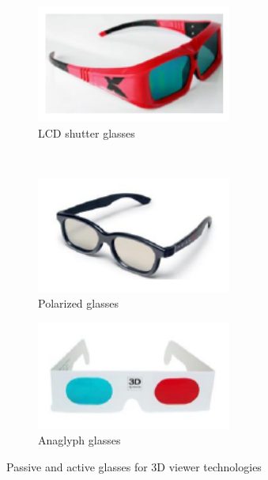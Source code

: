\begin{figure}[h!]
\centering
\label{fig:glass}
\begin{subfigure}[]{0.4\textwidth}
\centering
\includegraphics[width=0.7\textwidth]{./img/glass1.png}
\caption{\scriptsize{LCD shutter glasses}}
\label{fig:glass1}
\end{subfigure}%
~ %
\begin{subfigure}[]{0.4\textwidth}
\centering
\includegraphics[width=0.7\textwidth]{./img/glass2.png}
\caption{\scriptsize{Polarized glasses}}
\label{fig:glass2}
\end{subfigure} 
\begin{subfigure}[]{0.4\textwidth}
\centering
\includegraphics[width=0.7\textwidth]{./img/glass3.png}
\caption{\scriptsize{Anaglyph glasses}}
\label{fig:glass3}
\end{subfigure}%
\caption{\small{Passive and active glasses for 3D viewer technologies}}
\end{figure}
